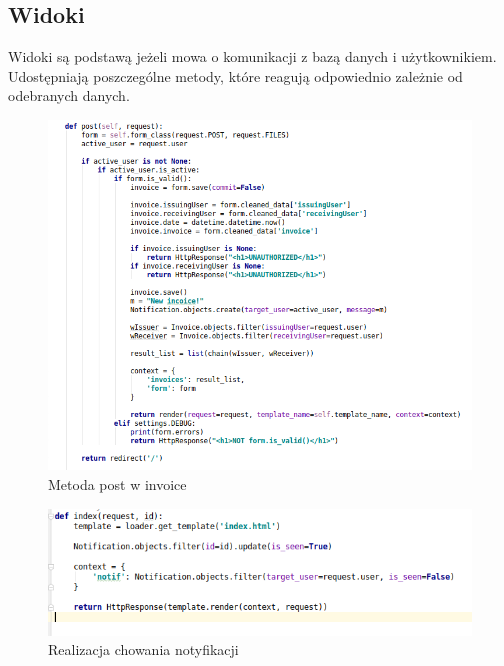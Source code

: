 \documentclass[12pt]{article}
\begin{document}
	\subsection{Widoki}
	Widoki są podstawą jeżeli mowa o komunikacji z bazą danych i użytkownikiem. Udostępniają poszczególne metody, które reagują odpowiednio zależnie od odebranych danych.
	\begin{figure}[H]
		\centering
		\includegraphics[scale=0.7]{img/c_invoice_post.png}
		\caption{Metoda post w invoice}
	\end{figure}
	\begin{figure}[H]
		\centering
		\includegraphics[scale=0.7]{img/c_notify_view.png}
		\caption{Realizacja chowania notyfikacji}
	\end{figure}
\end{document}
